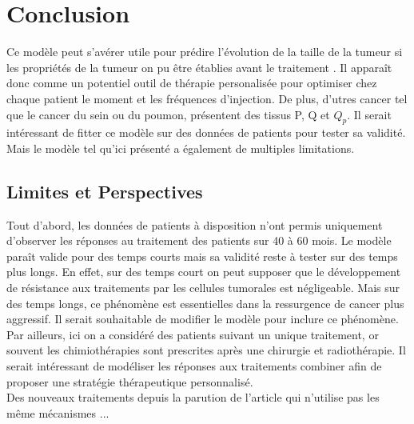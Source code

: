 \documentclass[12pt]{article}
\begin{document}
\section{Conclusion}
Ce modèle peut s'avérer utile pour prédire l'évolution de la taille de la tumeur si les propriétés de la tumeur on pu être établies avant le traitement \cite{}. Il apparaît donc comme un potentiel outil de thérapie personalisée pour optimiser chez chaque patient le moment et les fréquences d'injection.  De plus, d'utres cancer tel que le cancer du sein ou du poumon, présentent des tissus P, Q et $Q_{p}$. Il serait intéressant de fitter ce modèle sur des données de patients pour tester sa validité. Mais le modèle tel qu'ici présenté a également de multiples limitations. 
\subsection{Limites et Perspectives}
Tout d'abord, les données de patients à disposition n'ont permis uniquement d'observer les réponses au traitement des patients sur 40 à 60 mois.  Le modèle paraît valide pour des temps courts mais sa validité reste à tester sur des temps plus longs. En effet, sur des temps court on peut supposer que le développement de résistance aux traitements par les cellules tumorales est négligeable. Mais sur des temps longs, ce phénomène est essentielles dans la ressurgence de cancer plus aggressif. Il serait souhaitable de modifier le modèle pour inclure ce phénomène. \\
Par ailleurs, ici on a considéré des patients suivant un unique traitement, or souvent les chimiothérapies sont prescrites après une chirurgie et radiothérapie. Il serait intéressant de modéliser les réponses aux traitements combiner afin de proposer une stratégie thérapeutique personnalisé.\\
Des nouveaux traitements depuis la parution de l'article qui n'utilise pas les même mécanismes ... 
\end{document}
